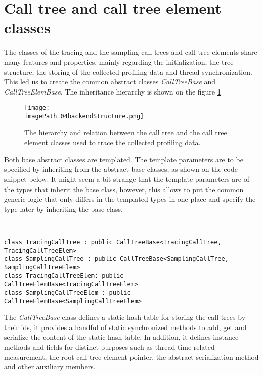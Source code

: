 \section{Call tree and call tree element classes}
The classes of the tracing and the sampling call trees and call tree elements share many features and properties, mainly regarding the initialization, the tree structure, the storing of the collected profiling data and thread synchronization. This led us to create the common abstract classes \textit{CallTreeBase} and \textit{CallTreeElemBase}. The inheritance hierarchy is shown on the figure \ref{fig:04backendStructure}


\begin{figure}
	\centering
		\texttt{[image: \\imagePath 04backendStructure.png]}
		\caption{The hierarchy and relation between the call tree and the call tree element classes used to trace the collected profiling data.}
	\label{fig:04backendStructure}
\end{figure}

Both base abstract classes are templated. The template parameters are to be specified by inheriting from the abstract base classes, as shown on the code snippet below. It might seem a bit strange that the template parameters are of the types that inherit the base class, however, this allows to put the common generic logic that only differs in the templated types in one place and specify the type later by inheriting the base class.

\ 

\begin{lstlisting} 
class TracingCallTree : public CallTreeBase<TracingCallTree, TracingCallTreeElem>
class SamplingCallTree : public CallTreeBase<SamplingCallTree, SamplingCallTreeElem>
class TracingCallTreeElem: public CallTreeElemBase<TracingCallTreeElem>
class SamplingCallTreeElem : public CallTreeElemBase<SamplingCallTreeElem>
\end{lstlisting}

The \textit{CallTreeBase} class defines a static hash table for storing the call trees by their ids, it provides a handful of static synchronized methods to add, get and serialize the content of the static hash table. In addition, it defines instance methods and fields for distinct purposes such as thread time related measurement, the root call tree element pointer, the abstract serialization method and other auxiliary members.

